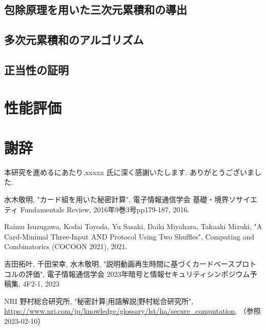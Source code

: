 \documentclass{jsreport}
\theoremstyle{plain} %
\theoremstyle{definition}
\begin{document}
\section{包除原理を用いた三次元累積和の導出}
\section{多次元累積和のアルゴリズム}
\section{正当性の証明}

\chapter{性能評価}

\chapter*{謝辞}
本研究を進めるにあたり,xxxxx 氏に深く感謝いたします. ありがとうございました.

\begin{thebibliography}{99}
水木敬明, "カード組を用いた秘密計算", 電子情報通信学会 基礎・境界ソサイエティ Fundamentals Review, 2016年9巻3号pp179-187, 2016.

Raimu Isuzugawa, Kodai Toyoda, Yu Sasaki, Daiki Miyahara, Takaaki Mizuki, "A Card-Minimal Three-Input AND Protocol Using Two Shuffles", Computing and Combinatorics (COCOON 2021), 2021.



吉田拓叶, 千田栄幸, 水木敬明, "説明動画再生時間に基づくカードベースプロトコルの評価", 電子情報通信学会 2023年暗号と情報セキュリティシンポジウム予稿集, 4F2-1, 2023

NRI 野村総合研究所, "秘密計算|用語解説|野村総合研究所", \url{https://www.nri.com/jp/knowledge/glossary/lst/ha/secure_computation}, （参照2023-02-10）

\end{thebibliography}
\end{document}

